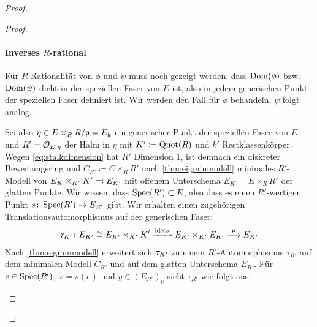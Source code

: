 \documentclass[german]{scrreprt}
\begin{document}
\begin{Satz}
\begin{proof}
\begin{Lemma}
\begin{proof}
        \paragraph{Inverses $R$-rational}
        Für $R$-Rationalität von $\phi$ und $\psi$ muss noch gezeigt
        werden, dass $\operatorname{Dom}(\phi)$ bzw. $\operatorname{Dom}(\psi)$ dicht in der
        speziellen Faser von $E$ ist, also in jedem generischen Punkt
        der speziellen Faser definiert ist.
        Wir werden den Fall für $\phi$ behandeln, $\psi$ folgt analog.
        
        Sei also $\eta\in E\times_R R/\mathfrak{p}=E_k$ ein generischer Punkt der
        speziellen Faser von $E$ und $R'=\mathcal{O}_{E,\eta}$ der Halm in
        $\eta$ mit $K'\coloneqq\operatorname{Quot}(R)$ und $k'$
        Restklassenkörper. Wegen \ref{eq:stalkdimension} hat $R'$
        Dimension 1, ist demnach ein diskreter Bewertungsring und
        $C_{R'}\coloneqq C\times_R R'$ nach \ref{thm:eigminmodell}
        minimales $R'$-Modell von $E_{K}\times_{K'}K'\eqqcolon E_{K'}$
        mit offenem Unterschema $E_{R'}=E\times_R R'$ der glatten Punkte.
        Wir wissen, dass $\operatorname{Spec}(R')\subset E$, also dass es
        einen $R'$-wertigen Punkt $s\colon\operatorname{Spec}(R')\to E_{R'}$ gibt.
        Wir erhalten einen zugehörigen Translationsautomorphismus auf der
        generischen Faser:
        \begin{gather*}
          \tau_{K'}\colon
          E_{K'}\cong E_{K'}\times_{K'}K'
          \xrightarrow{\mathrm{id}\times s}
          E_{K'}\times_{K'}E_{K'}
          \overset{\mu}{\longrightarrow}
          E_{K'}
        \end{gather*}
        Nach \ref{thm:eigminmodell} erweitert sich $\tau_{K'}$ zu
        einem $R'$-Automorphismus $\tau_{R'}$ auf dem minimalen Modell
        $C_{R'}$ und auf dem glatten Unterschema $E_{R'}$.
        Für $e\in\operatorname{Spec}(R')$, $x=s(e)$ und $y\in(E_{R'})_e$ sieht $\tau_{R'}$
        wie folgt aus:
        \begin{center}
        \end{center}

\end{proof}
\end{Lemma}
\end{proof}
\end{Satz}
\end{document}

